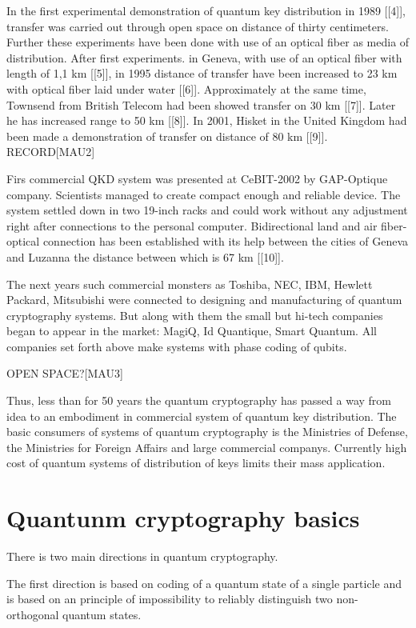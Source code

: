 In the first experimental demonstration of quantum key distribution in
1989 [[4]], transfer was carried out through open space on distance of
thirty centimeters. Further these experiments have been done with use
of an optical fiber as media of distribution. After first
experiments. in Geneva, with use of an optical fiber with length of
1,1 km [[5]], in 1995 distance of transfer have been increased to 23
km with optical fiber laid under water [[6]]. Approximately at the
same time, Townsend from British Telecom had been showed transfer on
30 km [[7]]. Later he has increased range to 50 km [[8]]. In 2001,
Hisket in the United Kingdom had been made a demonstration of transfer
on distance of 80 km [[9]]. RECORD[MAU2]

Firs commercial QKD system was presented at CeBIT-2002 by GAP-Optique
company. Scientists managed to create compact enough and reliable
device. The system settled down in two 19-inch racks and could work
without any adjustment right after connections to the personal
computer. Bidirectional land and air fiber-optical connection has been
established with its help between the cities of Geneva and Luzanna the
distance between which is 67 km [[10]].

The next years such commercial monsters as Toshiba, NEC, IBM, Hewlett
Packard, Mitsubishi were connected to designing and manufacturing of
quantum cryptography systems. But along with them the small but
hi-tech companies began to appear in the market: MagiQ, Id Quantique,
Smart Quantum. All companies set forth above make systems with phase
coding of qubits.


OPEN SPACE?[MAU3]

Thus, less than for 50 years the quantum cryptography has passed a way
from idea to an embodiment in commercial system of quantum key
distribution. The basic consumers of systems of quantum cryptography
is the Ministries of Defense, the Ministries for Foreign Affairs and
large commercial companys. Currently high cost of quantum systems of
distribution of keys limits their mass application.



\section{Quantunm cryptography basics}


There is two main directions in quantum cryptography.

The first direction is based on coding of a quantum state of a single
particle and is based on an principle of impossibility to reliably
distinguish two non-orthogonal quantum states.

